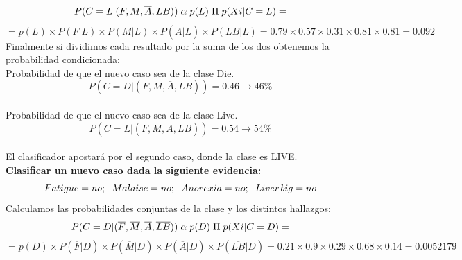 \documentclass[es]{ifirak}
\begin{document}
\begin{displaymath}
P (C = L | ( F , M ,\overline{A} , LB) ) \hspace{0.1cm} \alpha \hspace{0.1cm} p(L)\hspace{0.1cm} \Pi \hspace{0.1cm}p( Xi | C = L)  =
\end{displaymath}
\begin{displaymath}
= p(L)\times P(F | L )\times P( M | L )\times P(\overline{A}  | L ) \times P(LB | L) = 0.79 \times 0.57 \times 0.31 \times 0.81 \times 0.81 = 0.092
\end{displaymath}
Finalmente si dividimos cada resultado por la suma de los dos obtenemos la probabilidad condicionada:\\
Probabilidad de que el nuevo caso sea de la clase Die.\\
\begin{displaymath}
 P(C = D | ( F , M , \overline{A} , LB) ) = 0.46 \rightarrow 46\% 
\end{displaymath}\\
Probabilidad de que el nuevo caso sea de la clase Live.\\

\begin{displaymath}
 P(C = L | ( F , M , \overline{A} , LB) ) = 0.54 \rightarrow 54\%
\end{displaymath}\\
El clasificador apostará por el segundo caso, donde la clase es LIVE.\\

\textbf{Clasificar un nuevo caso dada la siguiente evidencia:}\\

$$Fatigue = no;\hspace{0.2cm} Malaise = no;\hspace{0.2cm} Anorexia = no;\hspace{0.2cm} Liver\hspace{0.05cm} big = no$$
Calculamos las probabilidades conjuntas de la clase y los distintos hallazgos:\\
\begin{displaymath}
P (C = D | ( \overline{F} , \overline{M} , \overline{A} , \overline{LB}) ) \hspace{0.1cm} \alpha  \hspace{0.1cm} p(D) \hspace{0.1cm} \Pi \hspace{0.1cm}p( Xi | C = D)=
\end{displaymath}
\begin{displaymath}
= p(D)\times P(\overline{F} | D )\times P( \overline{M} | D )\times P(\overline{A}  | D ) \times P(\overline{LB} | D) = 0.21 \times 0.9  \times 0.29 \times 0.68 \times 0.14 =0.0052179
\end{displaymath}
\end{document}
